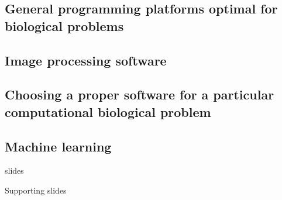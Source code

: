 \documentclass[10pt]{beamer}              %
\begin{document}
\subsection{General programming platforms optimal for biological problems}

\subsection{Image processing software}

\subsection{Choosing a proper software for a particular computational biological problem}

\subsection{Machine learning}

\begin{frame}{slides}

\end{frame}

\appendix
\begin{frame}{Supporting slides}

\end{frame}
\end{document}
